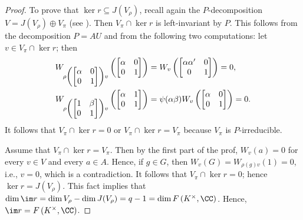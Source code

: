 \documentclass[../main.tex]{subfiles}
\begin{document}
\begin{proof}
	To prove that $\ker r\subseteq J(V_\rho)$, recall again the $P$-decomposition $V=J(V_\rho)\oplus V_\pi$ (see ). Then $V_\pi\cap\ker r$ is left-invariant by $P$. This follows from the decomposition $P=AU$ and from the following two computations: let $v\in V_\pi\cap\ker r$; then
	\begin{align}
		W_{\rho\left(\begin{bmatrix}
			\alpha & 0 \\
			0 & 1
		\end{bmatrix}\right)v}\left(\begin{bmatrix}
			\alpha & 0 \\
			0 & 1
		\end{bmatrix}\right)&=W_v\left(\begin{bmatrix}
			\alpha\alpha' & 0 \\
			0 & 1
		\end{bmatrix}\right)=0, \notag \\
		W_{\rho\left(\begin{bmatrix}
			1 & \beta \\
			0 & 1
		\end{bmatrix}\right)v}\left(\begin{bmatrix}
			\alpha & 1 \\
			0 & 1
		\end{bmatrix}\right)&=\psi(\alpha\beta)W_v\left(\begin{bmatrix}
			\alpha & 0 \\
			0 & 1
		\end{bmatrix}\right)=0. \label{eq:whittaker-apply-u}
	\end{align}
	It follows that $V_\pi\cap\ker r=0$ or $V_\pi\cap\ker r=V_\pi$ because $V_\pi$ is $P$-irreducible.

	Assume that $V_\pi\cap\ker r=V_\pi$. Then by the first part of the prof, $W_v(a)=0$ for every $v\in V$ and every $a\in A$. Hence, if $g\in G$, then $W_v(G)=W_{\rho(g)v}(1)=0$, i.e., $v=0$, which is a contradiction. It follows that $V_\pi\cap\ker r=0$; hence $\ker r=J(V_\rho)$. This fact implies that $\dim\im r=\dim V_\rho-\dim J(V_\rho)=q-1=\dim F\left(K^\times,\CC\right)$. Hence, $\im r=F\left(K^\times,\CC\right)$.
\end{proof}
\end{document}
